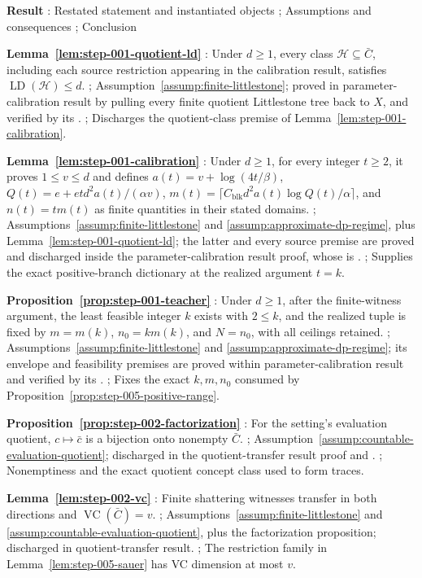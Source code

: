 \noindent\textbf{ Result }:  Restated statement and instantiated objects ;  Assumptions and consequences ;  Conclusion \par
\noindent\textbf{ Lemma~\ref{lem:step-001-quotient-ld} }:  Under \(d\ge1\), every class \(\mathcal H\subseteq\bar C\), including each source restriction appearing in the calibration result, satisfies \(\operatorname{LD}(\mathcal H)\le d\). ;  Assumption~\ref{assump:finite-littlestone}; proved in  parameter-calibration result by pulling every finite quotient Littlestone tree back to \(X\), and verified by its  . ;  Discharges the quotient-class premise of Lemma~\ref{lem:step-001-calibration}. \par
\noindent\textbf{ Lemma~\ref{lem:step-001-calibration} }:  Under \(d\ge1\), for every integer \(t\ge2\), it proves \(1\le v\le d\) and defines \(a(t)=v+\log(4t/\beta)\), \(Q(t)=e+etd^2a(t)/(\alpha v)\), \(m(t)=\lceil C_{\mathrm{blk}}d^2a(t)\log Q(t)/\alpha\rceil\), and \(n(t)=tm(t)\) as finite quantities in their stated domains. ;  Assumptions~\ref{assump:finite-littlestone} and \ref{assump:approximate-dp-regime}, plus Lemma~\ref{lem:step-001-quotient-ld}; the latter and every source premise are proved and discharged inside the  parameter-calibration result proof, whose  is . ;  Supplies the exact positive-branch dictionary at the realized argument \(t=k\). \par
\noindent\textbf{ Proposition~\ref{prop:step-001-teacher} }:  Under \(d\ge1\), after the  finite-witness argument, the least feasible integer \(k\) exists with \(2\le k\), and the realized tuple is fixed by \(m=m(k)\), \(n_0=km(k)\), and \(N=n_0\), with all ceilings retained. ;  Assumptions~\ref{assump:finite-littlestone} and \ref{assump:approximate-dp-regime}; its  envelope and feasibility premises are proved within parameter-calibration result and verified by its  . ;  Fixes the exact \(k,m,n_0\) consumed by Proposition~\ref{prop:step-005-positive-range}. \par
\noindent\textbf{ Proposition~\ref{prop:step-002-factorization} }:  For the setting's evaluation quotient, \(c\mapsto\bar c\) is a bijection onto nonempty \(\bar C\). ;  Assumption~\ref{assump:countable-evaluation-quotient}; discharged in the  quotient-transfer result proof and . ;  Nonemptiness and the exact quotient concept class used to form traces. \par
\noindent\textbf{ Lemma~\ref{lem:step-002-vc} }:  Finite shattering witnesses transfer in both directions and \(\operatorname{VC}(\bar C)=v\). ;  Assumptions~\ref{assump:finite-littlestone} and \ref{assump:countable-evaluation-quotient}, plus the  factorization proposition; discharged in  quotient-transfer result. ;  The restriction family in Lemma~\ref{lem:step-005-sauer} has VC dimension at most \(v\). \par
